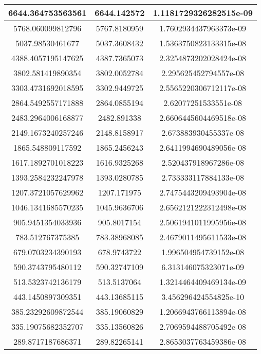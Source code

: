 \begin{longtable}[!h]{|c|c|c|}
    \hline
    6644.364753563561 & 6644.142572 & 1.1181729326282515e-09\\
    \hline
    5768.060099812796 & 5767.8180959 & 1.7602934437963373e-09\\
    \hline
    5037.98530461677 & 5037.3608432 & 1.5363750823133315e-08\\
    \hline
    4388.4057195147625 & 4387.7365073 & 2.3254873202028424e-08\\
    \hline
    3802.581419890354 & 3802.0052784 & 2.295625452794557e-08\\
    \hline
    3303.4731692018595 & 3302.9449725 & 2.5565220306712117e-08\\
    \hline
    2864.5492557171888 & 2864.0855194 & 2.62077251533551e-08\\
    \hline
    2483.2964006168877 & 2482.891338 & 2.6606445604469518e-08\\
    \hline
    2149.1673240257246 & 2148.8158917 & 2.673883930455337e-08\\
    \hline
    1865.548809117592 & 1865.2456243 & 2.6411994690489056e-08\\
    \hline
    1617.1892701018223 & 1616.9325268 & 2.520437918967286e-08\\
    \hline
    1393.2584232247978 & 1393.0280785 & 2.733333117884133e-08\\
    \hline
    1207.3721057629962 & 1207.171975 & 2.7475443209493904e-08\\
    \hline
    1046.1341685570235 & 1045.9636706 & 2.6562121222312498e-08\\
    \hline
    905.9451354033936 & 905.8017154 & 2.5061941011995956e-08\\
    \hline
    783.512767375385 & 783.38968085 & 2.4679011495611533e-08\\
    \hline
    679.0703234390193 & 678.9743722 & 1.996504954739152e-08\\
    \hline
    590.3743795480112 & 590.32747109 & 6.313146075323071e-09\\
    \hline
    513.5323742136179 & 513.5137064 & 1.3214464409469134e-09\\
    \hline
    443.1450897309351 & 443.13685115 & 3.456296424554825e-10\\
    \hline
    385.23292609872544 & 385.19060829 & 1.2066943766113894e-08\\
    \hline
    335.19075682352707 & 335.13560826 & 2.7069594488705492e-08\\
    \hline
    289.8717187686371 & 289.82265141 & 2.8653037763459386e-08\\

\end{longtable}
